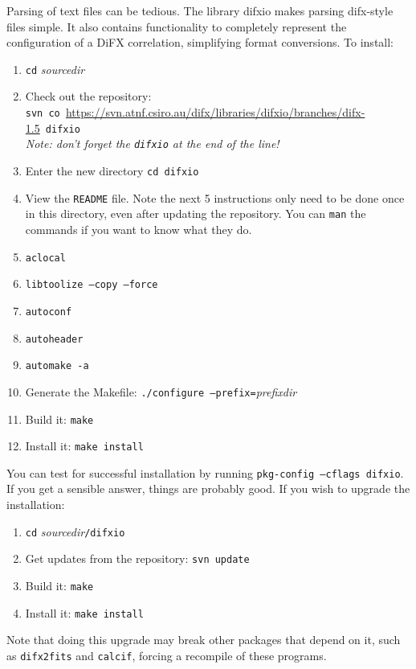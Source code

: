 Parsing of text files can be tedious.  
The library difxio makes parsing difx-style files simple.
It also contains functionality to completely represent the configuration of a DiFX correlation, simplifying format conversions.
To install:
\begin{enumerate}
\item {\tt cd} {\em sourcedir}
\item Check out the repository: \\
{\tt svn co }\url{https://svn.atnf.csiro.au/difx/libraries/difxio/branches/difx-1.5}{\tt\ difxio} \\
{\em Note: don't forget the {\tt difxio} at the end of the line!}
\item Enter the new directory {\tt cd difxio}
\item View the {\tt README} file.  
Note the next 5 instructions only need to be done once in this directory, even after updating the repository.
You can {\tt man} the commands if you want to know what they do.
\item {\tt aclocal}  
\item {\tt libtoolize --copy --force}
\item {\tt autoconf}
\item {\tt autoheader}
\item {\tt automake -a} 
\item Generate the Makefile: {\tt ./configure --prefix=}{\em prefixdir}
\item Build it: {\tt make}
\item Install it: {\tt make install}
\end{enumerate}

You can test for successful installation by running {\tt pkg-config --cflags difxio}.  
If you get a sensible answer, things are probably good.
If you wish to upgrade the installation:
\begin{enumerate}
\item {\tt cd} {\em sourcedir}{\tt /difxio}
\item Get updates from the repository: {\tt svn update}
\item Build it: {\tt make}
\item Install it: {\tt make install}
\end{enumerate}

Note that doing this upgrade may break other packages that depend on it, such as {\tt difx2fits} and {\tt calcif}, forcing a recompile of these programs.









